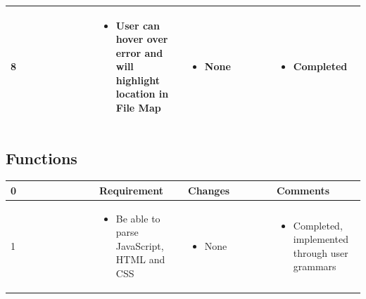 \documentclass[letterpaper,10pt,titlepage,draftclsnofoot,onecolumn,onesided] {IEEEtran}
\begin{document}
{\begin{center}
\begin{singlespace}
\begin{tabular}{ |  p{0.25\linewidth}  |  p{0.25\linewidth}  | p{0.25\linewidth} | p{0.25\linewidth} |}
        \\ \hline

        	8
		& 
			\begin{itemize}
				\item User can hover over error and will highlight location in File Map
			\end{itemize}
		& 
			\begin{itemize}
				\item None
			\end{itemize}
		&
			\begin{itemize}
				\item Completed
			\end{itemize} 
		
        \\ \hline
		\end{tabular}
	\end{singlespace}
\end{center}
}

\subsection{Functions}
\small{
\begin{center}
	\begin{singlespace}
		\begin{tabular}{ |  p{0.25\linewidth}  |  p{0.25\linewidth}  | p{0.25\linewidth} | p{0.25\linewidth} |}
		\hline
		0 & Requirement & Changes & Comments \\ \hline
		
			1
		& 
			\begin{itemize}
				\item Be able to parse JavaScript, HTML and CSS
			\end{itemize}
		& 
			\begin{itemize}
				\item None
			\end{itemize}
		&
			\begin{itemize}
				\item Completed, implemented through user grammars
			\end{itemize} 
		
        \\ \hline

		\end{tabular}
	\end{singlespace}
\end{center}
}
\end{document}

